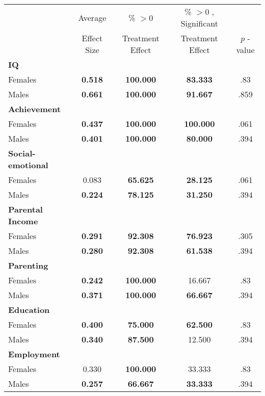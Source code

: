 \begin{tabular}{l c c c c}
\toprule
 & Average & \% $ >0 $ & \% $ >0 $ , Significant & \citet{Rosenbaum_2005_Distribution_JRSS} \\
 & Effect Size & Treatment Effect & Treatment Effect & $ p $ -value \\
\midrule
\textbf{IQ} & & & & \\
\quad Females &  \textbf{    0.518} & \textbf{  100.000} & \textbf{   83.333} & .83 \\
\quad Males &  \textbf{    0.661} & \textbf{  100.000} & \textbf{   91.667} & .859 \\
\midrule
\textbf{Achievement} & & & & \\
\quad Females &  \textbf{    0.437} & \textbf{  100.000} & \textbf{  100.000} & .061 \\
\quad Males &  \textbf{    0.401} & \textbf{  100.000} & \textbf{   80.000} & .394 \\
\midrule
\textbf{Social-emotional} & & & & \\
\quad Females &      0.083 & \textbf{   65.625} & \textbf{   28.125} & .061 \\
\quad Males &  \textbf{    0.224} & \textbf{   78.125} & \textbf{   31.250} & .394 \\
\midrule
\textbf{Parental Income} & & & & \\
\quad Females &  \textbf{    0.291} & \textbf{   92.308} & \textbf{   76.923} & .305 \\
\quad Males &  \textbf{    0.280} & \textbf{   92.308} & \textbf{   61.538} & .394 \\
\midrule
\textbf{Parenting} & & & & \\
\quad Females &  \textbf{    0.242} & \textbf{  100.000} &    16.667 & .83 \\
\quad Males &  \textbf{    0.371} & \textbf{  100.000} & \textbf{   66.667} & .394 \\
\midrule
\textbf{Education} & & & & \\
\quad Females &  \textbf{    0.400} & \textbf{   75.000} & \textbf{   62.500} & .83 \\
\quad Males &  \textbf{    0.340} & \textbf{   87.500} &    12.500 & .394 \\
\midrule
\textbf{Employment} & & & & \\
\quad Females &      0.330 & \textbf{  100.000} &    33.333 & .83 \\
\quad Males &  \textbf{    0.257} & \textbf{   66.667} & \textbf{   33.333} & .394 \\

\end{tabular}
